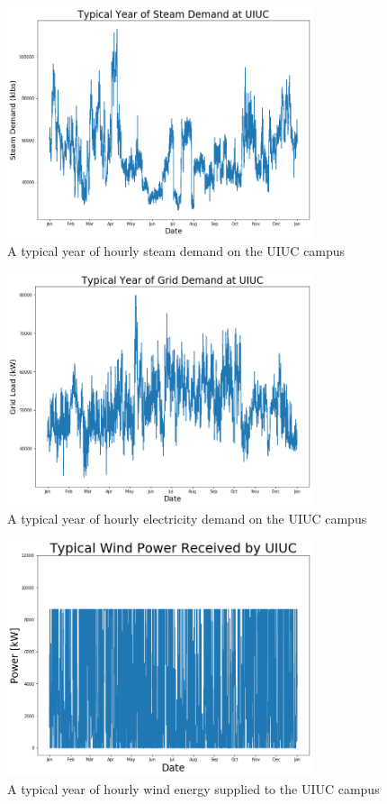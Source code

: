 \begin{figure}[H]
  \centering
  \includegraphics[width=0.8\textwidth]{typicalsteam}
  \caption{A typical year of hourly steam demand on the UIUC campus}
  \label{fig:typstm}
\end{figure}

\begin{figure}[H]
  \centering
  \includegraphics[width=0.8\textwidth]{typicaldemand}
  \caption{A typical year of hourly electricity demand on the UIUC campus}
  \label{fig:typelc}
\end{figure}

\begin{figure}[H]
  \centering
  \includegraphics[width=0.8\textwidth]{typicalwind}
  \caption{A typical year of hourly wind energy supplied to the UIUC campus}
  \label{fig:typwind}
\end{figure}


